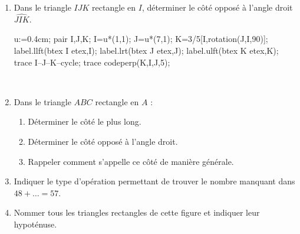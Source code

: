 \begin{activite}
\begin{spacing}{1.5}
\begin{enumerate}
            \begin{Geometrie}[CoinBG={(-u,-u)},CoinHD={(6u,6u)}]
                u:=0.4cm;
                pair E,F,G,H;
                E=u*(1,4);
                F=u*(4,1);
                G=1[F,rotation(E,F,-90)];
                H=1[E,rotation(F,E,90)];
                label.llft(btex E etex,E);
                label.lrt(btex  F etex,F);
                label.urt(btex  G etex,G);
                label.ulft(btex H etex,H);
                trace E--F--G--H--cycle;
                trace codeperp(E,F,G,5);
                trace codeperp(F,G,H,5);
                trace codeperp(G,H,E,5);
                marque_s:=marque_s/3;
                trace codesegments(E,F,F,G,2);
                trace codesegments(G,H,H,E,2);            
            \end{Geometrie}
            \smallskip\\\makebox[\linewidth]{\dotfill}
            \item Dans le triangle $IJK$ rectangle en $I$, déterminer le côté opposé à l'angle droit $\widehat{JIK}$.
            
            \begin{Geometrie}[CoinBG={(-u,-u)},CoinHD={(8u,4u)}]
                u:=0.4cm;
                pair I,J,K;
                I=u*(1,1);
                J=u*(7,1);            
                K=3/5[I,rotation(J,I,90)];
                label.llft(btex I etex,I);
                label.lrt(btex  J etex,J);
                label.ulft(btex  K etex,K);
                trace I--J--K--cycle;
                trace codeperp(K,I,J,5);
            \end{Geometrie}
            \smallskip\\\makebox[\linewidth]{\dotfill}
            \pagebreak
            \item Dans le triangle $ABC$ rectangle en $A$ :
            \begin{enumerate}
                \item Déterminer le côté le plus long.\smallskip\\\makebox[\linewidth]{\dotfill}
                \item Déterminer le côté opposé à l'angle droit.\smallskip\\\makebox[\linewidth]{\dotfill}
                \item Rappeler comment s'appelle ce côté de manière générale.\smallskip\\\makebox[\linewidth]{\dotfill}
            \end{enumerate}
            \item Indiquer le type d'opération permettant de trouver le nombre manquant dans $48 + \dots = 57$.\smallskip\\\makebox[\linewidth]{\dotfill}
            \item Nommer tous les triangles rectangles de cette figure et indiquer leur hypoténuse.
            

\end{enumerate}
\end{spacing}
\end{activite}
